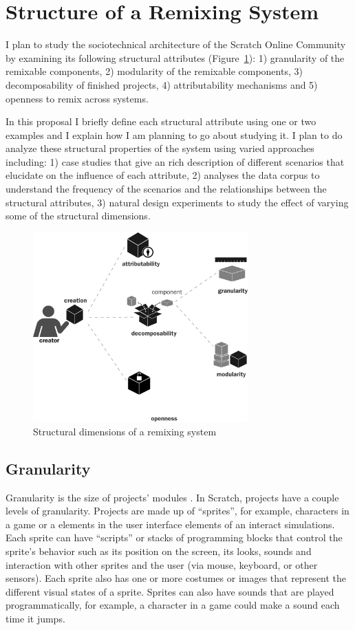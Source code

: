 \section{Structure of a Remixing System} 
I plan to study the sociotechnical architecture of the Scratch Online Community by examining its following structural attributes (Figure~\ref{fig:structure}):
1) granularity of the remixable components, 
2) modularity of the remixable components, 
3) decomposability of finished projects, 
4) attributability mechanisms and 
5) openness to remix across systems.

In this proposal I briefly define each structural attribute using one or two examples and I explain how I am planning to go about studying it.
I plan to do analyze these structural properties of the system using varied approaches including:
1) case studies that give an rich description of different scenarios that elucidate on the influence of each attribute,
2) analyses the data corpus to understand the frequency of the scenarios and the relationships between the structural attributes,
3) natural design experiments to study the effect of varying some of the structural dimensions.

\begin{figure} 
\centering
\includegraphics[width=3.25in]{figures/structure.pdf}
\caption{Structural dimensions of a remixing system}
\label{fig:structure}
\end{figure}

\subsection{Granularity}
Granularity is the size of projects' modules \citet{benkler_coases_2002}. 
In Scratch, projects have a couple levels of granularity.
Projects are made up of ``sprites'', for example, characters in a game or a elements in the user interface elements of an interact simulations.
Each sprite can have ``scripts'' or  stacks of programming blocks that control the sprite's behavior such as its position on the screen, its looks, sounds and interaction with other sprites and the user (via mouse, keyboard, or other sensors).
Each sprite also has one or more costumes or images that represent the different visual states of a sprite.
Sprites can also have sounds that are played programmatically, for example, a character in a game could make a sound each time it jumps.

